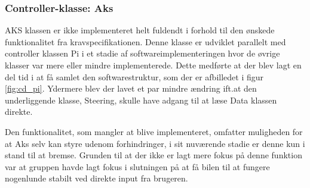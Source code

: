 \subsubsection{Controller-klasse: Aks} \label{sec:aks_impl}

AKS klassen er ikke implementeret helt fuldendt i forhold til den ønskede funktionalitet fra kravspecifikationen.
Denne klasse er udviklet parallelt med controller klassen Pi i et stadie af softwareimplementeringen hvor de øvrige klasser var mere eller mindre implementerede.
Dette medførte at der blev lagt en del tid i at få samlet den softwarestruktur, som der er afbilledet i figur \ref{fig:cd_pi}.
Ydermere blev der lavet et par mindre ændring ift.at den underliggende klasse, Steering, skulle have adgang til at læse Data klassen direkte.

Den funktionalitet, som mangler at blive implementeret, omfatter muligheden for at Aks selv kan styre udenom forhindringer, i sit nuværende stadie er denne kun i stand til at bremse.
Grunden til at der ikke er lagt mere fokus på denne funktion var at gruppen havde lagt fokus i slutningen på at få bilen til at fungere nogenlunde stabilt ved direkte input fra brugeren.